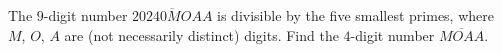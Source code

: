 The $9$-digit number $\overline{20240MOAA}$ is divisible by the five smallest primes, where $M$, $O$, $A$ are (not necessarily distinct) digits. Find the $4$-digit number $\overline{MOAA}$.
